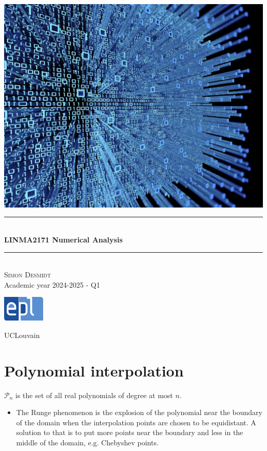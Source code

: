 \documentclass[12pt, openany]{report}
\newcommand{\HRule}{\rule{\linewidth}{0.5mm}}
\theoremstyle{definition}
\begin{document}
\begin{titlepage}
    \begin{sffamily}
    \begin{center}
        \includegraphics[scale=0.25]{img/page_de_garde.png} \\[1cm]
        \HRule \\[0.4cm]
        { \huge \bfseries LINMA2171 Numerical Analysis \\[0.4cm] }
    
        \HRule \\[1.5cm]
        \textsc{\LARGE Simon Desmidt}\\[1cm]
        \vfill
        \vspace{2cm}
        {\large Academic year 2024-2025 - Q1}
        \vspace{0.4cm}
         
        \includegraphics[width=0.15\textwidth]{img/epl.png}
        
        UCLouvain\\
    
    \end{center}
    \end{sffamily}
\end{titlepage}

\setcounter{tocdepth}{1}
\tableofcontents
\chapter{Polynomial interpolation}
\(\mathcal{P}_n\) is the set of all real polynomials of degree at most \(n\). 
\begin{itemize}
    \item The Runge phenomenon is the explosion of the polynomial near the boundary of the domain when the interpolation points are chosen to be equidistant. A solution to that is to put more points near the boundary and less in the middle of the domain, e.g. Chebyshev points.
\end{itemize}
\end{document}
